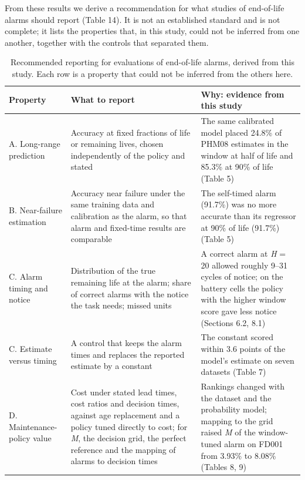 \documentclass[a4paper,fleqn,doubleblind]{cas-dc}
\begin{document}
From these results we derive a recommendation for what studies of end-of-life alarms should report (Table 14). It is not an established standard and is not complete; it lists the properties that, in this study, could not be inferred from one another, together with the controls that separated them.

\begin{table}[!tbp]
\footnotesize\setlength{\tabcolsep}{4pt}
\caption{Recommended reporting for evaluations of end-of-life alarms, derived from this study. Each row is a property that could not be inferred from the others here.}
\begin{tabular}{@{}>{\raggedright\arraybackslash}p{}>{\raggedright\arraybackslash}p{}>{\raggedright\arraybackslash}p{}@{}}
\toprule
Property & What to report & Why: evidence from this study \\
\midrule
A. Long-range prediction & Accuracy at fixed fractions of life or remaining lives, chosen independently of the policy and stated & The same calibrated model placed 24.8\% of PHM08 estimates in the window at half of life and 85.3\% at 90\% of life (Table 5) \\
B. Near-failure estimation & Accuracy near failure under the same training data and calibration as the alarm, so that alarm and fixed-time results are comparable & The self-timed alarm (91.7\%) was no more accurate than its regressor at 90\% of life (91.7\%) (Table 5) \\
C. Alarm timing and notice & Distribution of the true remaining life at the alarm; share of correct alarms with the notice the task needs; missed units & A correct alarm at \textit{H} = 20 allowed roughly 9--31 cycles of notice; on the battery cells the policy with the higher window score gave less notice (Sections 6.2, 8.1) \\
C. Estimate versus timing & A control that keeps the alarm times and replaces the reported estimate by a constant & The constant scored within 3.6 points of the model's estimate on seven datasets (Table 7) \\
D. Maintenance-policy value & Cost under stated lead times, cost ratios and decision times, against age replacement and a policy tuned directly to cost; for \textit{M}, the decision grid, the perfect reference and the mapping of alarms to decision times & Rankings changed with the dataset and the probability model; mapping to the grid raised \textit{M} of the window-tuned alarm on FD001 from 3.93\% to 8.08\% (Tables 8, 9) \\

\end{tabular}
\end{table}
\end{document}
